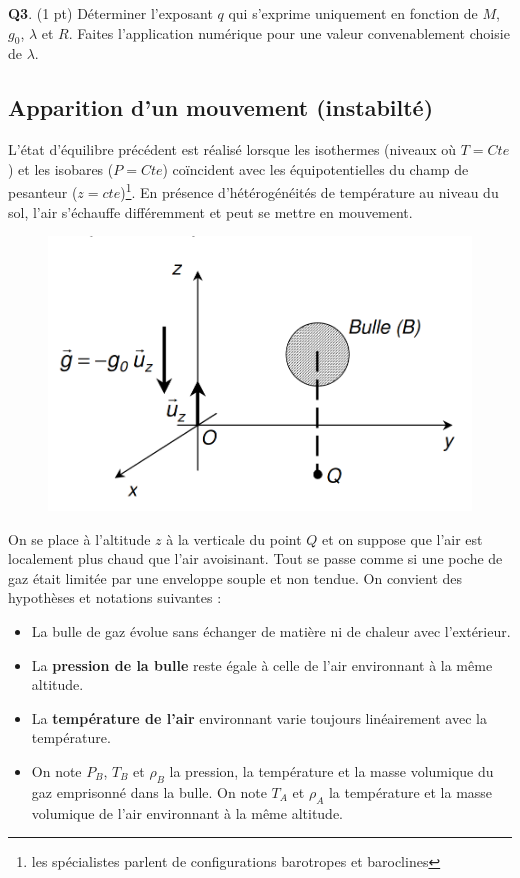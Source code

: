 \documentclass[letterpaper, 11pt]{article}
\begin{document}
\textbf{Q3}. (1 pt) Déterminer l’exposant \(q\) qui s'exprime uniquement en fonction de \(M\), \(g_0\), \(\lambda\) et \(R\). Faites l'application numérique pour une valeur convenablement choisie de \(\lambda\).


\subsection{Apparition d'un mouvement (instabilté)}
\label{sec:org300707c}

L'état d'équilibre précédent est réalisé lorsque les isothermes (niveaux où \(T=Cte\)) et les isobares (\(P=Cte\)) coïncident avec les équipotentielles du champ de pesanteur (\(z = cte\))\footnote{les spécialistes parlent de configurations barotropes et baroclines}. En présence d’hétérogénéités de température au niveau du sol, l'air s'échauffe différemment et peut se mettre en mouvement.

\bigskip

\begin{figure}[htbp]
\centering
\includegraphics[width=.9\linewidth]{./Ex2a.png}
\end{figure}

On se place à l'altitude \(z\) à la verticale du point \(Q\) et on suppose que l'air est localement plus chaud que l'air avoisinant. Tout se passe comme si une poche de gaz était limitée par une enveloppe souple et non tendue. On convient des hypothèses et notations suivantes : 

\begin{itemize}
\item La bulle de gaz évolue sans échanger de matière ni de chaleur avec l'extérieur.

\item La \textbf{pression de la bulle} reste égale à celle de l'air environnant à la même altitude.

\item La \textbf{température de l'air} environnant varie toujours linéairement avec la température.

\item On note \(P_B\), \(T_B\) et \(\rho_B\) la pression, la température et la masse volumique du gaz emprisonné dans la bulle. On note \(T_A\) et \(\rho_A\) la température et la masse volumique de l'air environnant à la même altitude.
\end{itemize}
\end{document}
